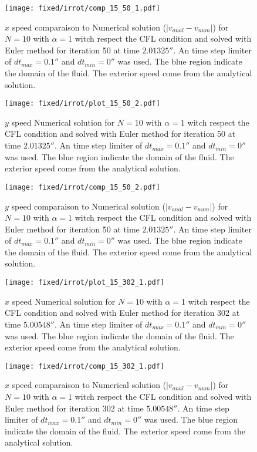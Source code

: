 \begin{figure}
\texttt{[image: fixed/irrot/comp\_15\_50\_1.pdf]}
\caption{$x$ speed comparaison to Numerical solution ($|v_{anal}-v_{num}|$) for $N=10$ with $\alpha=1$ witch respect the CFL condition and solved with Euler method
for iteration 50 at time $\unit{2.01325}{\second}$.
An time step limiter of $dt_{max}=\unit{0.1}{\second}$ and $dt_{min}=\unit{0}{\second}$ was used.
The blue region indicate the domain of the fluid. The exterior speed come from the analytical solution.
\label{fix:comp_15_50_1}
}
\end{figure}

\begin{figure}
\texttt{[image: fixed/irrot/plot\_15\_50\_2.pdf]}
\caption{$y$ speed Numerical solution for $N=10$ with $\alpha=1$ witch respect the CFL condition and solved with Euler method
for iteration 50 at time $\unit{2.01325}{\second}$.
An time step limiter of $dt_{max}=\unit{0.1}{\second}$ and $dt_{min}=\unit{0}{\second}$ was used.
The blue region indicate the domain of the fluid. The exterior speed come from the analytical solution.
\label{fix:plot_15_50_2}
}
\end{figure}

\begin{figure}
\texttt{[image: fixed/irrot/comp\_15\_50\_2.pdf]}
\caption{$y$ speed comparaison to Numerical solution ($|v_{anal}-v_{num}|$) for $N=10$ with $\alpha=1$ witch respect the CFL condition and solved with Euler method
for iteration 50 at time $\unit{2.01325}{\second}$.
An time step limiter of $dt_{max}=\unit{0.1}{\second}$ and $dt_{min}=\unit{0}{\second}$ was used.
The blue region indicate the domain of the fluid. The exterior speed come from the analytical solution.
\label{fix:comp_15_50_2}
}
\end{figure}

\clearpage

\begin{figure}
\texttt{[image: fixed/irrot/plot\_15\_302\_1.pdf]}
\caption{$x$ speed Numerical solution for $N=10$ with $\alpha=1$ witch respect the CFL condition and solved with Euler method
for iteration 302 at time $\unit{5.00548}{\second}$.
An time step limiter of $dt_{max}=\unit{0.1}{\second}$ and $dt_{min}=\unit{0}{\second}$ was used.
The blue region indicate the domain of the fluid. The exterior speed come from the analytical solution.
\label{fix:plot_15_302_1}
}
\end{figure}

\begin{figure}
\texttt{[image: fixed/irrot/comp\_15\_302\_1.pdf]}
\caption{$x$ speed comparaison to Numerical solution ($|v_{anal}-v_{num}|$) for $N=10$ with $\alpha=1$ witch respect the CFL condition and solved with Euler method
for iteration 302 at time $\unit{5.00548}{\second}$.
An time step limiter of $dt_{max}=\unit{0.1}{\second}$ and $dt_{min}=\unit{0}{\second}$ was used.
The blue region indicate the domain of the fluid. The exterior speed come from the analytical solution.
\label{fix:comp_15_302_1}
}
\end{figure}

